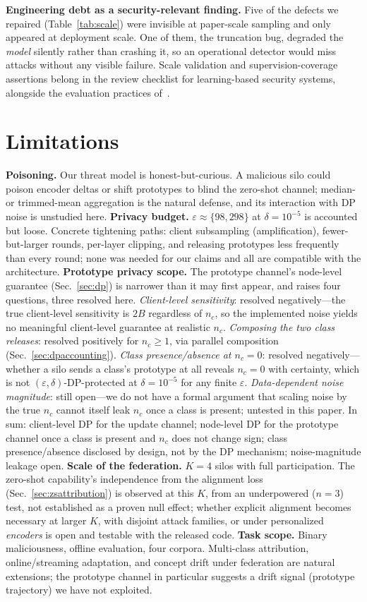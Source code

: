 \documentclass[journal]{IEEEtran}
\newcommand{\eps}{\varepsilon}
\begin{document}
\textbf{Engineering debt as a security-relevant finding.} Five of the
defects we repaired (Table~\ref{tab:scale}) were invisible at
paper-scale sampling and only appeared at deployment scale. One of
them, the truncation bug, degraded the \emph{model} silently rather
than crashing it, so an operational detector would miss attacks
without any visible failure. Scale validation and supervision-coverage
assertions belong in the review checklist for learning-based security
systems, alongside the evaluation practices of~\cite{arp}.

\section{Limitations}
\label{sec:limitations}
\textbf{Poisoning.} Our threat model is honest-but-curious. A
malicious silo could poison encoder deltas or shift prototypes to
blind the zero-shot channel; median- or trimmed-mean aggregation is
the natural defense, and its interaction with DP noise is unstudied
here.
\textbf{Privacy budget.} $\eps \approx \{98, 298\}$ at $\delta{=}10^{-5}$
is accounted but loose. Concrete tightening paths: client subsampling
(amplification), fewer-but-larger rounds, per-layer clipping, and
releasing prototypes less frequently than every round; none was needed
for our claims and all are compatible with the architecture.
\textbf{Prototype privacy scope.} The prototype channel's node-level
guarantee (Sec.~\ref{sec:dp}) is narrower than it may first appear,
and raises four questions, three resolved here. \emph{Client-level
sensitivity}: resolved negatively---the true client-level sensitivity
is $2B$ regardless of $n_c$, so the implemented noise yields no
meaningful client-level guarantee at realistic $n_c$.
\emph{Composing the two class releases}: resolved positively for
$n_c \ge 1$, via parallel composition (Sec.~\ref{sec:dpaccounting}).
\emph{Class presence/absence at $n_c{=}0$}: resolved
negatively---whether a silo sends a class's prototype at all reveals
$n_c{=}0$ with certainty, which is not $(\eps,\delta)$-DP-protected at
$\delta{=}10^{-5}$ for any finite $\eps$. \emph{Data-dependent noise
magnitude}: still open---we do not have a formal argument that scaling
noise by the true $n_c$ cannot itself leak $n_c$ once a class is
present; untested in this paper. In sum: client-level DP for the
update channel; node-level DP for the prototype channel once a class
is present and $n_c$ does not change sign; class presence/absence
disclosed by design, not by the DP mechanism; noise-magnitude leakage
open.
\textbf{Scale of the federation.} $K{=}4$ silos with full
participation. The zero-shot capability's independence from the
alignment loss (Sec.~\ref{sec:zsattribution}) is observed at this $K$,
from an underpowered ($n{=}3$) test, not established as a proven null
effect; whether explicit alignment becomes necessary at larger $K$,
with disjoint attack families, or under personalized \emph{encoders}
is open and testable with the released code.
\textbf{Task scope.} Binary maliciousness, offline evaluation, four
corpora. Multi-class attribution, online/streaming adaptation, and
concept drift under federation are natural extensions; the prototype
channel in particular suggests a drift signal (prototype trajectory)
we have not exploited.
\end{document}
